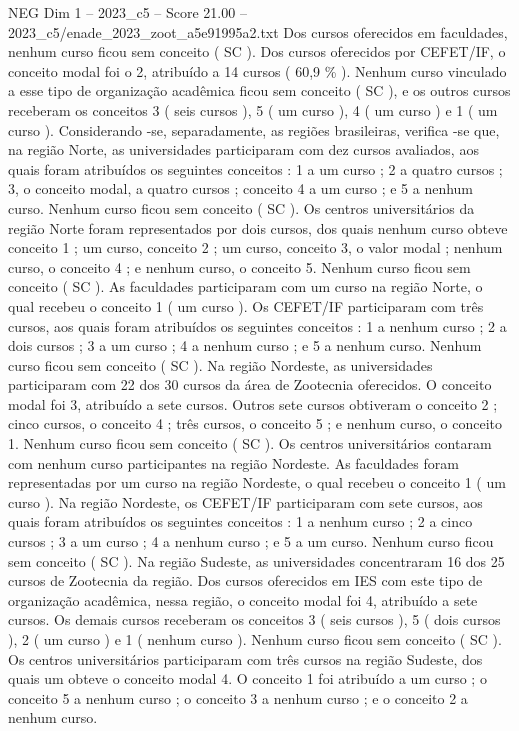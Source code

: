 \begin{textsample}{NEG Dim 1 – 2023\_c5 – Score 21.00 – 2023\_c5/enade\_2023\_zoot\_a5e91995a2.txt}
Dos cursos oferecidos em faculdades, nenhum curso ficou sem conceito ( SC ).
Dos cursos oferecidos por CEFET/IF, o conceito modal foi o 2, atribuído a 14 cursos ( 60,9 \% ).
Nenhum curso vinculado a esse tipo de organização acadêmica ficou sem conceito ( SC ), e os outros cursos receberam os conceitos 3 ( seis cursos ), 5 ( um curso ), 4 ( um curso ) e 1 ( um curso ).
Considerando -se, separadamente, as regiões brasileiras, verifica -se que, na região Norte, as universidades participaram com dez cursos avaliados, aos quais foram atribuídos os seguintes conceitos : 1 a um curso ; 2 a quatro cursos ; 3, o conceito modal, a quatro cursos ; conceito 4 a um curso ; e 5 a nenhum curso.
Nenhum curso ficou sem conceito ( SC ).
Os centros universitários da região Norte foram representados por dois cursos, dos quais nenhum curso obteve conceito 1 ; um curso, conceito 2 ; um curso, conceito 3, o valor modal ; nenhum curso, o conceito 4 ; e nenhum curso, o conceito 5.
Nenhum curso ficou sem conceito ( SC ).
As faculdades participaram com um curso na região Norte, o qual recebeu o conceito 1 ( um curso ).
Os CEFET/IF participaram com três cursos, aos quais foram atribuídos os seguintes conceitos : 1 a nenhum curso ; 2 a dois cursos ; 3 a um curso ; 4 a nenhum curso ; e 5 a nenhum curso.
Nenhum curso ficou sem conceito ( SC ).
Na região Nordeste, as universidades participaram com 22 dos 30 cursos da área de Zootecnia oferecidos.
O conceito modal foi 3, atribuído a sete cursos.
Outros sete cursos obtiveram o conceito 2 ; cinco cursos, o conceito 4 ; três cursos, o conceito 5 ; e nenhum curso, o conceito 1.
Nenhum curso ficou sem conceito ( SC ).
Os centros universitários contaram com nenhum curso participantes na região Nordeste.
As faculdades foram representadas por um curso na região Nordeste, o qual recebeu o conceito 1 ( um curso ).
Na região Nordeste, os CEFET/IF participaram com sete cursos, aos quais foram atribuídos os seguintes conceitos : 1 a nenhum curso ; 2 a cinco cursos ; 3 a um curso ; 4 a nenhum curso ; e 5 a um curso.
Nenhum curso ficou sem conceito ( SC ).
Na região Sudeste, as universidades concentraram 16 dos 25 cursos de Zootecnia da região.
Dos cursos oferecidos em IES com este tipo de organização acadêmica, nessa região, o conceito modal foi 4, atribuído a sete cursos.
Os demais cursos receberam os conceitos 3 ( seis cursos ), 5 ( dois cursos ), 2 ( um curso ) e 1 ( nenhum curso ).
Nenhum curso ficou sem conceito ( SC ).
Os centros universitários participaram com três cursos na região Sudeste, dos quais um obteve o conceito modal 4.
O conceito 1 foi atribuído a um curso ; o conceito 5 a nenhum curso ; o conceito 3 a nenhum curso ; e o conceito 2 a nenhum curso.

\end{textsample}
